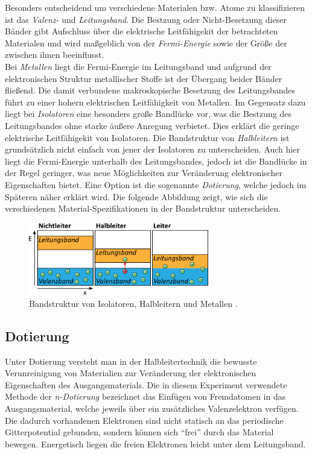 \noindent Besonders entscheidend um verschiedene Materialen bzw. Atome zu klassifizieren ist das \textit{Valenz-} und \textit{Leitungsband}. Die Bestzung 
oder Nicht-Besetzung dieser Bänder gibt Aufschluss über die elektrische Leitfähigekit der betrachteten Materialen und wird maßgeblich von der 
\textit{Fermi-Energie} sowie der Größe der  zwischen ihnen beeinflusst. \\

\noindent Bei \textit{Metallen} liegt die Fermi-Energie im Leitungsband und aufgrund der elektronischen Struktur metallischer Stoffe ist der Übergang beider 
Bänder fließend. Die damit verbundene makroskopische Besetzung des Leitungsbandes führt zu einer hohern elektrischen Leitfähigkeit von Metallen.
Im Gegensatz dazu liegt bei \textit{Isolatoren} eine besonders große Bandlücke vor, was die Bestzung des Leitungsbandes ohne starke äußere Anregung verbietet.
Dies erklärt die geringe elektrische Leitfähigekit von Isolatoren. Die Bandstruktur von \textit{Halbleitern} ist grundsätzlich nicht einfach von jener der 
Isolatoren zu unterscheiden. Auch hier liegt die Fermi-Energie unterhalb des Leitungsbandes, jedoch ist die Bandlücke in der Regel geringer, was neue 
Möglichkeiten zur Veränderung elektronischer Eigenschaften bietet. Eine Option ist die sogenannte \textit{Dotierung}, welche jedoch im Späteren 
näher erklärt wird. Die folgende Abbildung zeigt, wie sich die verschiedenen Material-Spezifikationen in der Bandstruktur unterscheiden. \\

\begin{figure}[H]
    \centering
    \includegraphics[width=0.7\textwidth]{content/MetIsoHalb.png}
    \caption{Bandstruktur von Isolatoren, Halbleitern und Metallen \cite{Bandstrukturen}.}
    \label{fig:MetIsoHalb}
\end{figure}

\subsection{Dotierung}

\noindent Unter Dotierung versteht man in der Halbleitertechnik die bewusste Verunreinigung von Materialien zur Veränderung
der elektronischen Eigenschaften des Ausgangsmaterials. Die in diesem Experiment verwendete Methode der \textit{n-Dotierung}
bezeichnet das Einfügen von Fremdatomen in das Ausgangsmaterial, welche jeweils über ein zusätzliches Valenzelektron verfügen. 
Die dadurch vorhandenen Elektronen sind nicht statisch an das periodische Gitterpotential gebunden, sondern können sich \enquote{frei} 
durch das Material bewegen. Energetisch liegen die freien Elektronen leicht unter dem Leitungsband.

